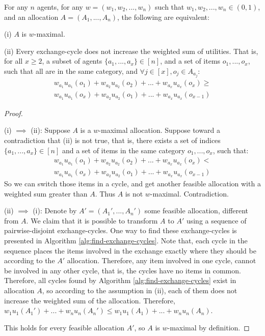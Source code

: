 \documentclass[sigconf]{aamas}
\theoremstyle{definition}
\newenvironment{customthm}[1]
  {\renewcommand\theinnercustomthm{#1}\innercustomthm}
  {\endinnercustomthm}
\begin{document}
\begin{customthm}{\ref{lem:diffs}}
For any $n$ agents,
for any $w=(w_1,w_2,...,w_n)$ such that $w_1,w_2,...,w_n\in(0,1)$, and an allocation $A=(A_1,...,A_n)$, the following are equivalent:

(i) $A$ is $w$-maximal.


(ii) Every exchange-cycle does not increase the weighted sum of utilities.
That is, for all $x\geq 2$, a subset of agents $\{a_1,...,a_x\}\in [n]$, and a set of items $o_1,...,o_x$, such that all are in the same category, and $\forall j\in [x], o_j\in A_{a_j}$:
\begin{align*}
    w_{a_1} u_{a_1} (o_1) + w_{a_2} u_{a_2} (o_2) + ... + w_{a_x} u_{a_x} (o_x) \geq \\
    w_{a_1} u_{a_1} (o_x) + w_{a_2} u_{a_2} (o_1) + ... + w_{a_x} u_{a_x} (o_{x-1})
\end{align*}
\end{customthm}
\begin{proof}~

(i) $\implies$ (ii):
Suppose $A$ is a $w$-maximal allocation. Suppose toward a contradiction that (ii) is not true, that is, there exists a set of indices $\{a_1,...,a_x\}\in [n]$ and a set of items in the same category $o_1,...,o_x$, such that:
\begin{align*}
    w_{a_1} u_{a_1} (o_1) + w_{a_2} u_{a_2} (o_2) + ... + w_{a_x} u_{a_x} (o_x) < \\
    w_{a_1} u_{a_1} (o_x) + w_{a_2} u_{a_2} (o_1) + ... + w_{a_x} u_{a_x} (o_{x-1})
\end{align*}
So we can switch those items in a cycle, and get another feasible allocation with a weighted sum greater than $A$. Thus $A$ is not $w$-maximal. Contradiction.

(ii) $\implies$ (i): 
Denote by $A'=(A_1',...,A_n')$ some feasible allocation, different from $A$.
We claim that it is possible to transform $A$ to $A'$ using a sequence of pairwise-disjoint exchange-cycles.
One way to find these exchange-cycles is presented in Algorithm \ref{alg:find-exchange-cycles}. 
Note that, each cycle in the sequence places the items involved in the exchange exactly where they should be according to the $A'$ allocation. Therefore, any item involved in one cycle, cannot be involved in any other cycle, that is, the cycles have no items in common.
Therefore, all cycles found by Algorithm \ref{alg:find-exchange-cycles} exist in allocation $A$, so according to the assumption in (ii), each of them does not increase the weighted sum of the allocation.
Therefore, $w_1u_1(A_1')+...+w_nu_n(A_n') \leq w_1u_1(A_1)+...+w_nu_n(A_n)$.

This holds for every feasible allocation $A'$, so $A$ is $w$-maximal by definition. 
\end{proof}
\end{document}
